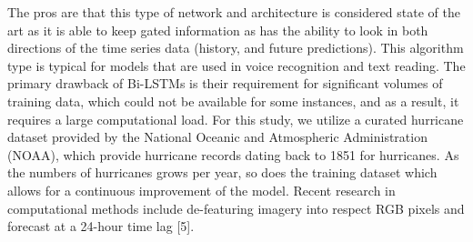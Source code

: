 \documentclass{article}
\begin{document}
The pros are that this type of network and architecture is considered state of the art as it is able to keep gated information as has the ability to look in both directions of the time series data (history, and future predictions). %
This algorithm type is typical for models that are used in voice recognition and text reading. The primary drawback of Bi-LSTMs is their requirement for significant volumes of training data, which could not be available for some instances, and as a result, it requires a large computational load. %
For this study, we utilize a curated hurricane dataset provided by the National Oceanic and Atmospheric Administration (NOAA), which provide hurricane records dating back to 1851 for hurricanes. %
As the numbers of hurricanes grows per year, so does the training dataset which allows for a continuous improvement of the model. Recent research in computational methods include de-featuring imagery into respect RGB pixels and forecast at a 24-hour time lag [5]. %
\end{document}
